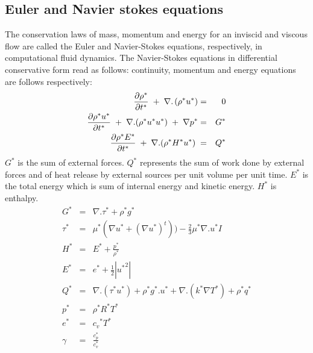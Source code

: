 \documentclass[11pt,a4paper]{article}
\begin{document}
\subsection{Euler and Navier stokes equations}
The conservation laws of mass, momentum and energy for an inviscid and viscous flow are
called the Euler and Navier-Stokes equations, respectively, in computational fluid dynamics.
The Navier-Stokes equations in differential conservative form read as follows:
continuity, momentum and energy equations are follows respectively:
\begin{eqnarray}
\frac{\partial \rho^*}{\partial t^*}\hspace{1mm}+\hspace{1mm}\nabla.\hspace{0.5mm}(\rho^* u^*) &=& 0 \\
\frac{\partial\rho^* u^*}{\partial t^*}\hspace{1mm}+\hspace{1mm}\nabla. (\rho^* u^* u^*) \hspace{1mm}+\hspace{1mm}\nabla p^* &=& G^* \\
\frac{\partial\rho^* E^*}{\partial t^*}\hspace{1mm}+\hspace{1mm}\nabla. (\rho^* H^* u^*) \hspace{1mm}&=& Q^* \\
\end{eqnarray}
$G^*$ is the sum of external forces. $Q^*$ represents the sum of work done by external forces and of heat release by external sources per unit volume per unit time. $E^*$ is the total energy which is sum of internal energy and kinetic energy. $H^*$ is enthalpy.
\begin{eqnarray}
G^*&=& \nabla.\tau^* + \rho^* g^* \\
\tau^* &=& \mu^*(\nabla u^* +(\nabla u^*)^t)) - \frac{2}{3}\mu^*\nabla. u^* I \\
H^* &=& E^* + \frac{p^*}{\rho^*} \\
E^* &=& e^* + \frac{1}{2}|{u^*}^2| \\
Q^* &=& \nabla.(\tau^* u^*) + \rho^* g^*.u^*+ \nabla.(k^* \nabla T^*)+ \rho^* q^* \\
p^* &=& \rho^* R^* T^* \\
e^* &=& {c_v}^* T^* \\
\gamma &=& \frac{c_p^*}{c_v^*}
\end{eqnarray}
\end{document}
